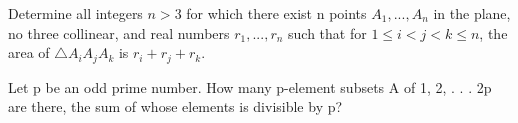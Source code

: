 
\item Determine all integers $n > 3$ for which there exist n points $A_1, ... , A_n$
in the plane, no three collinear, and real numbers $r_1, ... , r_n$ such that
for $1 \leq i < j < k \leq n$, the area of $\triangle A_iA_jA_k$ is $r_i + r_j + r_k$.\\

\item Let p be an odd prime number. How many p-element subsets A of
{1, 2, . . . 2p} are there, the sum of whose elements is divisible by p?





